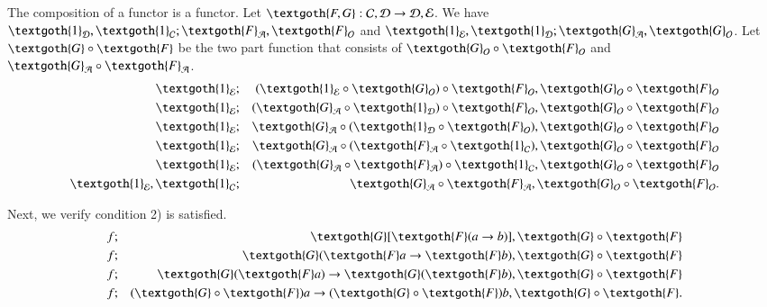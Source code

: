 \documentclass [12pt]{book}
\begin{document}
The composition of a functor is a functor. Let $\textgoth{F,G}:\mathcal{C,D}\rightarrow\mathcal{D,E}$. We have $\textgoth{1}_{\mathcal{D}},\textgoth{1}_{\mathcal{C}};\textgoth{F}_{\mathcal{A}},\textgoth{F}_{\mathcal{O}}$ and $\textgoth{1}_{\mathcal{E}},\textgoth{1}_{\mathcal{D}};\textgoth{G}_{\mathcal{A}},\textgoth{G}_{\mathcal{O}}$. Let $\textgoth{G}\circ\textgoth{F}$ be the two part function that consists of $\textgoth{G}_{\mathcal O}\circ\textgoth{F}_{\mathcal O}$ and $\textgoth{G}_{\mathcal A}\circ\textgoth{F}_{\mathcal A}$.
 \begin{eqnarray}\nonumber\textgoth{1}_{\mathcal{E}}&;&(\textgoth{1}
_{\mathcal{E}}\circ\textgoth{G}_{\mathcal{O}})\circ\textgoth{F}_{\mathcal{O}},\textgoth{G}_{\mathcal{O}}\circ
\textgoth{F}_{\mathcal{O}}\\\nonumber\textgoth{1}_{\mathcal{E}}&;
&(\textgoth{G}_{\mathcal{A}}\circ\textgoth{1}_{\mathcal{D}})\circ\textgoth{F}
_{\mathcal{O}},\textgoth{G}_{\mathcal{O}}\circ
\textgoth{F}_{\mathcal{O}}\\\nonumber\textgoth{1}_{\mathcal{E}}&;
&\textgoth{G}_{\mathcal{A}}\circ(\textgoth{1}_{\mathcal{D}}\circ\textgoth{F}
_{\mathcal{O}}),\textgoth{G}_{\mathcal{O}}\circ
\textgoth{F}_{\mathcal{O}}\\\nonumber\textgoth{1}_{\mathcal{E}}&;
&\textgoth{G}_{\mathcal{A}}\circ(\textgoth{F}
_{\mathcal{A}}\circ \textgoth{1}_{\mathcal{C}}),\textgoth{G}_{\mathcal{O}}\circ
\textgoth{F}_{\mathcal{O}}\\\nonumber\textgoth{1}_{\mathcal{E}}&;
&(\textgoth{G}_{\mathcal{A}}\circ\textgoth{F}
_{\mathcal{A}})\circ \textgoth{1}_{\mathcal{C}},\textgoth{G}_{\mathcal{O}}\circ
\textgoth{F}_{\mathcal{O}}\\\nonumber\textgoth{1}_{\mathcal{E}},\textgoth{1}_{\mathcal{C}}&;
&\textgoth{G}_{\mathcal{A}}\circ\textgoth{F}
_{\mathcal{A}},\textgoth{G}_{\mathcal{O}}\circ
\textgoth{F}_{\mathcal{O}}.\end{eqnarray}

Next, we verify condition 2) is satisfied.
\begin{eqnarray}\nonumber f&;&\textgoth{G}[\textgoth{F}(a\rightarrow b)],\textgoth{G}\circ\textgoth{F}\\\nonumber f&;&\textgoth{G}(\textgoth{F}a\rightarrow\textgoth{F}b),\textgoth{G}\circ\textgoth{F}\\\nonumber f&;&\textgoth{G}(\textgoth{F}a)\rightarrow\textgoth{G}(\textgoth{F}b),\textgoth{G}\circ\textgoth{F}\\\nonumber f&;&(\textgoth{G}\circ\textgoth{F})a\rightarrow(\textgoth{G}\circ\textgoth{F})b,\textgoth{G}\circ\textgoth{F}.\end{eqnarray}
\end{document}
